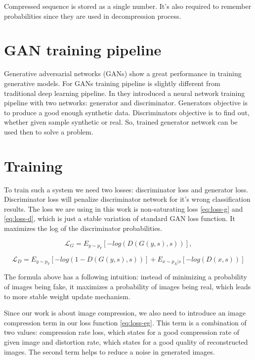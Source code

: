 Compressed sequence is stored as a single number. It's also required to remember probabilities since they are used in decompression process.

\section{GAN training pipeline}

Generative adversarial networks (GANs) show a great performance in training generative models. For GANs training pipeline is slightly different from traditional deep learning pipeline. In \cite{Goodfellow_Pouget-Abadie_Mirza_Xu_Warde-Farley_Ozair_Courville_Bengio_2014} they introduced a neural network training pipeline with two networks: generator and discriminator. Generators objective is to produce a good enough synthetic data. Discriminators objective is to find out, whether given sample synthetic or real. So, trained generator network can be used then to solve a problem.

\section{Training}

To train such a system we need two losses: discriminator loss and generator loss. Discriminator loss will penalize discriminator network for it's wrong classification results. The loss we are using in this work is non-saturating loss \ref{eq:loss-g} and \ref{eq:loss-d}, which is just a stable variation of standard GAN loss function. It maximizes the log of the discriminator probabilities.

\begin{equation}
    \label{eq:loss-g}
    \mathcal{L}_G=E_{y\sim p_Y}[-log(D(G(y,s),s))],
\end{equation}

\begin{equation}
    \label{eq:loss-d}
    \mathcal{L}_D=E_{y\sim p_Y}[-log(1-D(G(y,s),s))]+E_{x\sim p_X|s}[-log(D(x,s))]
\end{equation}

The formula above has a following intuition: instead of minimizing a probability of images being fake, it maximizes a probability of images being real, which leads to more stable weight update mechanism.

Since our work is about image compression, we also need to introduce an image compression term in our loss function \ref{eq:loss-eg}. This term is a combination of two values: compression rate loss, which states for a good compression rate of given image and distortion rate, which states for a good quality of reconstructed images. The second term helps to reduce a noise in generated images.

